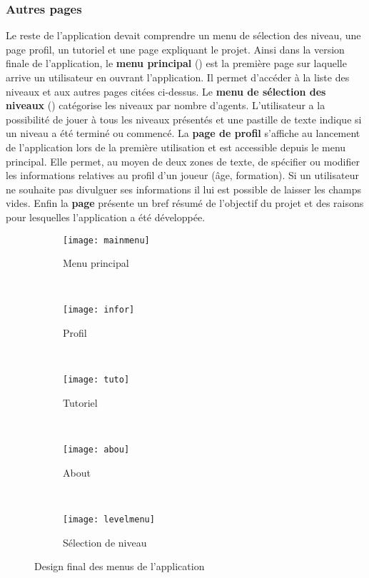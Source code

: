 \documentclass[../main.tex]{subfiles}
\begin{document}
    \subsubsection{Autres pages}
    
    Le reste de l'application devait comprendre un menu de sélection des niveau, une page profil, un tutoriel et une page  expliquant le projet. Ainsi dans la version finale de l'application, le \textbf{menu principal} () est la première page sur laquelle arrive un utilisateur en ouvrant l'application. Il permet d'accéder à la liste des niveaux et aux autres pages citées ci-dessus. Le \textbf{menu de sélection des niveaux} () catégorise les niveaux par nombre d'agents. L'utilisateur a la possibilité de jouer à tous les niveaux présentés et une pastille de texte indique si un niveau a été terminé ou commencé. La \textbf{page de profil} s'affiche au lancement de l'application lors de la première utilisation et est accessible depuis le menu principal. Elle permet, au moyen de deux zones de texte, de spécifier ou modifier les informations relatives au profil d'un joueur (âge, formation). Si un utilisateur ne souhaite pas divulguer ses informations il lui est possible de laisser les champs vides. Enfin la \textbf{page } présente un bref résumé de l'objectif du projet et des raisons pour lesquelles l'application a été développée.
	
\begin{figure}[ht!]
    \centering
    \begin{subfigure}{0.3\textwidth}
        \centering
        \texttt{[image: mainmenu]}
        \caption{Menu principal}
        \label{fig-mainmenu}
    \end{subfigure}
    ~
    \begin{subfigure}{0.3\textwidth}
        \centering
        \texttt{[image: infor]}
        \caption{Profil}
        \label{fig-profile}
    \end{subfigure}
    ~
    \begin{subfigure}{0.3\textwidth}
        \centering
        \texttt{[image: tuto]}
        \caption{Tutoriel}
        \label{fig-tuto}
    \end{subfigure}
    ~
    \begin{subfigure}{0.34\textwidth}
        \centering
        \texttt{[image: abou]}
        \caption{About}
        \label{fig-about}
    \end{subfigure}
    ~
    \begin{subfigure}{0.34\textwidth}
        \centering
        \texttt{[image: levelmenu]}
        \caption{Sélection de niveau}
        \label{fig-levelmenu}
    \end{subfigure}
    \caption{Design final des menus de l'application}
    \label{fig-screen1}
\end{figure}
\end{document}
